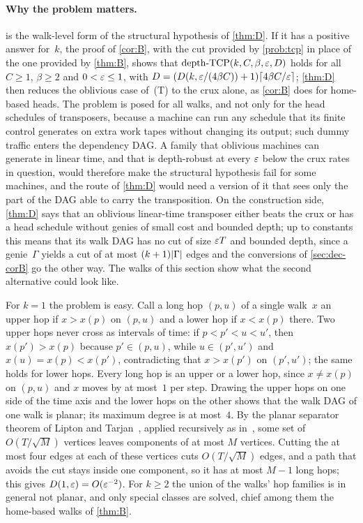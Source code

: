 \paragraph{Why the problem matters.}  is the walk-level form of the structural hypothesis of \cref{thm:D}. If it
has a positive answer for~$k$, the proof of \cref{cor:B}, with the cut provided by \cref{prob:tcp} in place of the one
provided by \cref{thm:B}, shows that $\mathrm{depth}\text{-}\mathrm{TCP}(k,C,\beta,\varepsilon,D)$ holds for all $C\ge1$,
$\beta\ge2$ and $0<\varepsilon\le1$, with $D=(D(k,\varepsilon/(4\beta C))+1)\lceil4\beta C/\varepsilon\rceil$; \cref{thm:D} then reduces
the oblivious case
of~(T) to the crux alone, as \cref{cor:B} does for home-based heads. The problem is posed for all walks, and not only
for the head schedules of transposers, because a machine can run any schedule that its finite control generates on
extra work tapes without changing its output; such dummy traffic enters the dependency DAG. A family that
oblivious machines can generate in linear time, and that is depth-robust at every $\varepsilon$ below the crux rates in
question, would therefore make the structural hypothesis fail for some machines, and the route of \cref{thm:D} would
need a version of it that sees only the part of the DAG able to carry the transposition. On the
construction side, \cref{thm:D} says that an oblivious linear-time transposer either beats the crux or has a head
schedule without genies of small cost and bounded depth; up to constants this means that its walk DAG has no cut of
size $\varepsilon T$ and bounded depth, since a genie~$\Gamma$ yields a cut of at most $(k+1)\lvert \Gamma \rvert$ edges and the
conversions of \cref{sec:dec-corB} go the other way. The walks of this section show what the second alternative could
look like.

For $k=1$ the problem is easy. Call a long hop $(p,u)$ of a single walk~$x$ an upper hop if $x>x(p)$ on $(p,u)$ and a
lower hop if $x<x(p)$ there. Two upper hops never cross as intervals of time: if $p<p'<u<u'$, then $x(p')>x(p)$
because $p'\in(p,u)$, while $u\in(p',u')$ and $x(u)=x(p)<x(p')$, contradicting that $x>x(p')$ on $(p',u')$; the same
holds for lower hops. Every long hop is an upper or a lower hop, since $x\ne x(p)$ on $(p,u)$ and $x$ moves by at most~$1$ per
step. Drawing the upper hops on one side of the time axis and the lower hops on the other shows that
the walk DAG of one walk is planar; its maximum degree is at most~$4$. By the planar separator theorem of Lipton and
Tarjan~\cite{LiptonTarjan1979}, applied recursively as in~\cite{LiptonTarjan1980}, some set of $O(T/\sqrt M)$ vertices
leaves components of at most $M$ vertices. Cutting the at most four edges at each of these vertices cuts
$O(T/\sqrt M)$ edges, and a path that avoids the cut stays inside one component, so it has at most $M-1$ long hops;
this gives $D(1,\varepsilon)=O(\varepsilon^{-2})$. For $k\ge2$ the union of the walks' hop families is in general not planar, and only special
classes are solved, chief among them the home-based walks of \cref{thm:B}.

